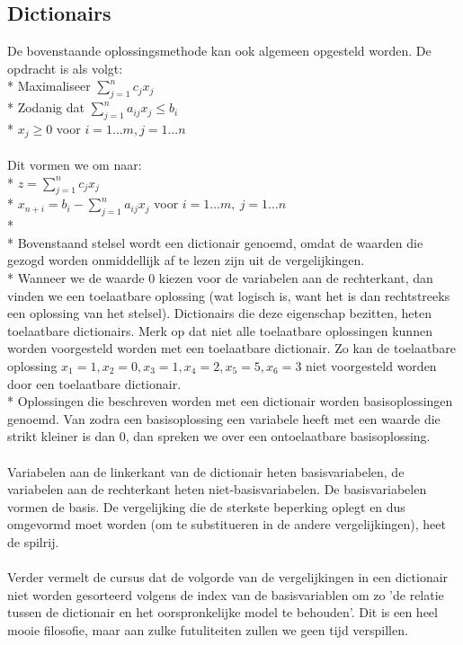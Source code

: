 \documentclass[10pt]{article}
\begin{document}
\subsection{Dictionairs}
De bovenstaande oplossingsmethode kan ook algemeen opgesteld worden. De opdracht is als volgt:\\*
Maximaliseer $\sum_{j=1}^nc_jx_j$\\*
Zodanig dat $\sum_{j=1}^na_{ij}x_j \le b_i$\\*
$x_j \ge 0$ voor $i = 1 \dots m, j = 1 \dots n$\\\\
Dit vormen we om naar:\\*
$z = \sum_{j=1}^nc_jx_j$\\*
$x_{n+i} = b_i - \sum_{j=1}^na_{ij}x_j$ voor $i = 1 \dots m,\ j = 1 \dots n$\\*\\*
Bovenstaand stelsel wordt een dictionair genoemd, omdat de waarden die gezogd worden onmiddellijk af te lezen zijn uit de vergelijkingen.\\*
Wanneer we de waarde $0$ kiezen voor de variabelen aan de rechterkant, dan vinden we een toelaatbare oplossing (wat logisch is, want het is dan rechtstreeks een oplossing van het stelsel). Dictionairs die deze eigenschap bezitten, heten toelaatbare dictionairs. Merk op dat niet alle toelaatbare oplossingen kunnen worden voorgesteld worden met een toelaatbare dictionair. Zo kan de toelaatbare oplossing $x_1 = 1, x_2 = 0, x_3 = 1, x_4 = 2, x_5 = 5, x_6 = 3$ niet voorgesteld worden door een toelaatbare dictionair.\\*
Oplossingen die beschreven worden met een dictionair worden basisoplossingen genoemd. Van zodra een basisoplossing een variabele heeft met een waarde die strikt kleiner is dan $0$, dan spreken we over een ontoelaatbare basisoplossing.\\\\
Variabelen aan de linkerkant van de dictionair heten basisvariabelen, de variabelen aan de rechterkant heten niet-basisvariabelen. De basisvariabelen vormen de basis. De vergelijking die de sterkste beperking oplegt en dus omgevormd moet worden (om te substitueren in de andere vergelijkingen), heet de spilrij.\\\\
Verder vermelt de cursus dat de volgorde van de vergelijkingen in een dictionair niet worden gesorteerd volgens de index van de basisvariablen om zo 'de relatie tussen de dictionair en het oorspronkelijke model te behouden'. Dit is een heel mooie filosofie, maar aan zulke futuliteiten zullen we geen tijd verspillen.
\end{document}
